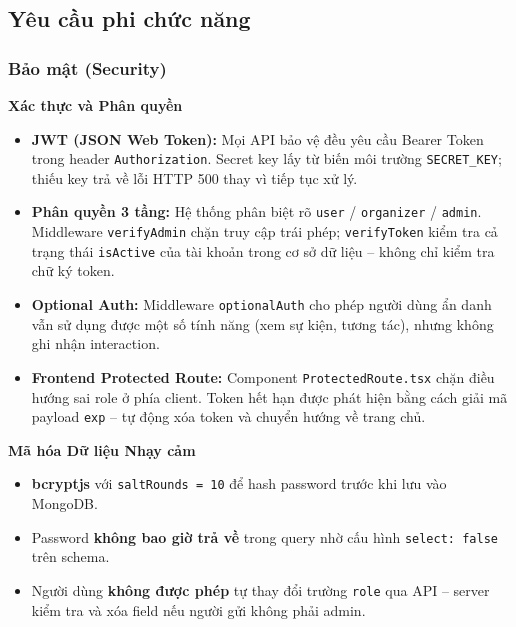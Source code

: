 \subsection{Yêu cầu phi chức năng}

\subsubsection{Bảo mật (Security)}

\textbf{Xác thực và Phân quyền}

\begin{itemize}[leftmargin=*, label={--}]
    \item \textbf{JWT (JSON Web Token):} Mọi API bảo vệ đều yêu cầu Bearer Token
    trong header \texttt{Authorization}. Secret key lấy từ biến môi trường
    \texttt{SECRET\_KEY}; thiếu key trả về lỗi HTTP 500 thay vì tiếp tục xử lý.

    \item \textbf{Phân quyền 3 tầng:} Hệ thống phân biệt rõ \texttt{user} /
    \texttt{organizer} / \texttt{admin}. Middleware \texttt{verifyAdmin} chặn truy
    cập trái phép; \texttt{verifyToken} kiểm tra cả trạng thái \texttt{isActive}
    của tài khoản trong cơ sở dữ liệu -- không chỉ kiểm tra chữ ký token.

    \item \textbf{Optional Auth:} Middleware \texttt{optionalAuth} cho phép người
    dùng ẩn danh vẫn sử dụng được một số tính năng (xem sự kiện, tương tác),
    nhưng không ghi nhận interaction.

    \item \textbf{Frontend Protected Route:} Component \texttt{ProtectedRoute.tsx}
    chặn điều hướng sai role ở phía client. Token hết hạn được phát hiện bằng
    cách giải mã payload \texttt{exp} -- tự động xóa token và chuyển hướng về
    trang chủ.
\end{itemize}

\textbf{Mã hóa Dữ liệu Nhạy cảm}

\begin{itemize}[leftmargin=*, label={--}]
    \item \textbf{bcryptjs} với \texttt{saltRounds = 10} để hash password trước
    khi lưu vào MongoDB.

    \item Password \textbf{không bao giờ trả về} trong query nhờ cấu hình
    \texttt{select: false} trên schema.

    \item Người dùng \textbf{không được phép} tự thay đổi trường \texttt{role}
    qua API -- server kiểm tra và xóa field nếu người gửi không phải admin.
\end{itemize}

